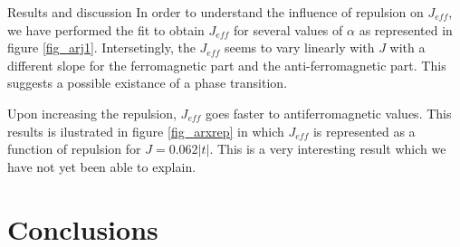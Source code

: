 \documentclass[12pt,twoside]{report}
\begin{document}
\begin{chapter}{Results and discussion}
	In order to understand the influence of repulsion on $J_{eff}$, we have
	performed the fit to obtain $J_{eff}$ for several values of $\alpha$ as
	represented in figure \ref{fig_arj1}. Intersetingly, the $J_{eff}$ seems to
	vary linearly with $J$ with a different slope for the ferromagnetic part and
	the anti-ferromagnetic part. This suggests a possible existance of a phase
	transition.

	Upon increasing the repulsion, $J_{eff}$ goes faster to antiferromagnetic
	values. This results is ilustrated in figure \ref{fig_arxrep} in which
	$J_{eff}$ is represented as a function of repulsion for $J=0.062|t|$. This
	is a very interesting result which we have not yet been able to explain.


	\end{chapter} %
	
	\chapter*{Conclusions}
	\newpage
	\renewcommand{\bibname}{References}
		\setcounter{page}{2}
\end{document}
